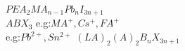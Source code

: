 \documentclass[9pt]{article}
\begin{document}
$ PEA_2 MA_{n-1} Pb_n I_{3n+1} $ \\
$ ABX_3 $
e.g:$MA^+,Cs^+,FA^+$ \\
e.g:$Pb^{2+},Sn^{2+}$
$(LA)_2(A)_2B_n X_{3n+1}$
\end{document}
